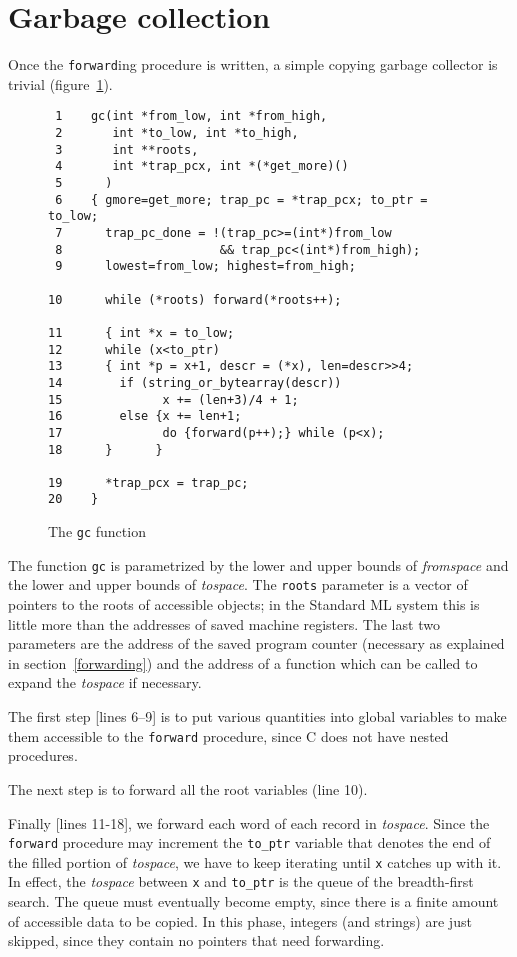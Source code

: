 \section{Garbage collection}
\label{garbage}

Once the \verb"forward"ing procedure is written, a simple copying garbage
collector is trivial (figure~\ref{gc}).
\begin{figure}[htbp]
\label{gc}
\begin{verbatim}
 1    gc(int *from_low, int *from_high,
 2       int *to_low, int *to_high,
 3       int **roots,
 4       int *trap_pcx, int *(*get_more)()
 5      )
 6    { gmore=get_more; trap_pc = *trap_pcx; to_ptr = to_low;
 7      trap_pc_done = !(trap_pc>=(int*)from_low 
 8                      && trap_pc<(int*)from_high);
 9      lowest=from_low; highest=from_high;

10      while (*roots) forward(*roots++);

11      { int *x = to_low;
12      while (x<to_ptr)
13      { int *p = x+1, descr = (*x), len=descr>>4;
14        if (string_or_bytearray(descr)) 
15              x += (len+3)/4 + 1;
16        else {x += len+1;
17              do {forward(p++);} while (p<x);
18      }      }

19      *trap_pcx = trap_pc;
20    }
\end{verbatim}
\caption{The {\tt gc} function}
\end{figure}
The function \verb|gc| is parametrized by the lower and upper bounds
of {\em fromspace} and the lower and upper bounds of {\em tospace}.  The \verb"roots"
parameter is a vector of pointers to the roots of accessible objects;
in the Standard ML system this is little more than the addresses of
saved machine registers.  The last two parameters are the address
of the saved program counter (necessary as explained in 
section~\ref{forwarding})
and the address of a function which can be called to expand the {\em tospace}
if necessary.

The first step [lines 6--9] is to put various quantities into global
variables to make them accessible to the \verb"forward" procedure,
since C does not have nested procedures.

The next step is to forward all the root variables (line 10).

Finally [lines 11-18],
we forward each word of each record in {\em tospace}.  Since the
\verb|forward| procedure may increment the \verb"to_ptr" variable
that denotes the end of the filled portion of {\em tospace}, we have to
keep iterating until \verb|x| catches up with it.  In effect,
the {\em tospace} between \verb|x| and \verb|to_ptr| is the queue of the
breadth-first search.  The queue must eventually become empty,
since there is a finite amount of accessible data to be copied.
In this phase, integers (and strings) are just skipped, since
they contain no pointers that need forwarding.

